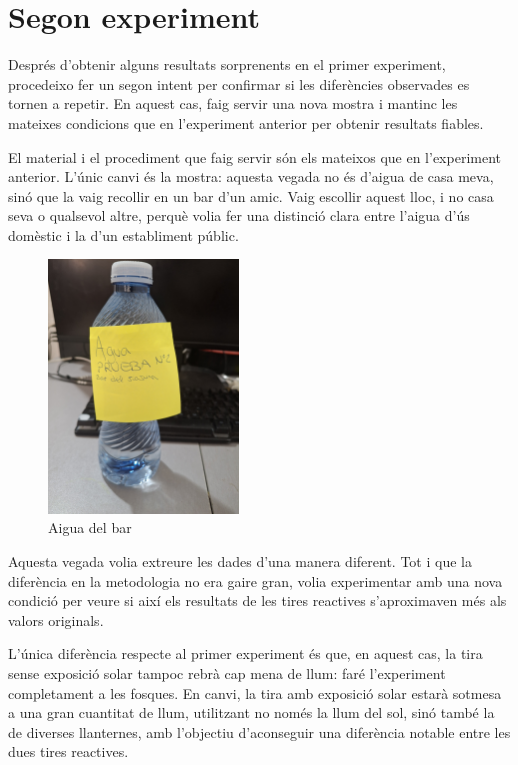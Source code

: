 \clearpage

\section{Segon experiment}


Després d’obtenir alguns resultats sorprenents en el primer experiment, procedeixo fer un segon intent per confirmar si les diferències observades es tornen a repetir. En aquest cas, faig servir una nova mostra i mantinc les mateixes condicions que en l'experiment anterior per obtenir resultats fiables.

El material i el procediment que faig servir són els mateixos que en l’experiment anterior. L’únic canvi és la mostra: aquesta vegada no és d’aigua de casa meva, sinó que la vaig recollir en un bar d’un amic. Vaig escollir aquest lloc, i no casa seva o qualsevol altre, perquè volia fer una distinció clara entre l’aigua d’ús domèstic i la d’un establiment públic.
\begin{figure}[H]
\centering
\includegraphics[width=0.45\textwidth, angle=270]{./Figures/AguaBar.png}
\caption{Aigua del bar}
\label{fig:AguaDelBar}
\end{figure}
Aquesta vegada volia extreure les dades d’una manera diferent. Tot i que la diferència en la metodologia no era gaire gran, volia experimentar amb una nova condició per veure si així els resultats de les tires reactives s’aproximaven més als valors originals.

L’única diferència respecte al primer experiment és que, en aquest cas, la tira sense exposició solar tampoc rebrà cap mena de llum: faré l’experiment completament a les fosques. En canvi, la tira amb exposició solar estarà sotmesa a una gran cuantitat de llum, utilitzant no només la llum del sol, sinó també la de diverses llanternes, amb l’objectiu d’aconseguir una diferència notable entre les dues tires reactives.


